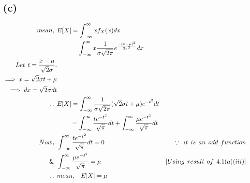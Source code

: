 \documentclass[a4paper,fleqn,11pt]{article}
\theoremstyle{mytheor}
\begin{document}
\subsection{(c)}
\begin{align*}
mean, \hspace{1ex} & E[X] = \int_{-\infty}^{\infty} x f_{X} (x) dx \\
& \hspace{5ex} = \int_{-\infty}^{\infty} x \frac{1}{\sigma \sqrt{2\pi}} e^{\frac{-(x - \mu)^2}{2 \sigma^2}} dx \\
Let \hspace{1ex} t = \frac{x - \mu}{\sqrt{2} \sigma}. \\
\implies x = \sqrt{2} \sigma t + \mu \\
\implies dx = \sqrt{2} \sigma dt \\
\therefore \hspace{1ex} & E[X] = \int_{-\infty}^{\infty} \frac{1}{\sigma \sqrt{2\pi}} (\sqrt{2}\sigma t + \mu) e^{-t^2} dt \\
& \hspace{5ex} = \int_{-\infty}^{\infty} \frac{t e^{-t^2}}{\sqrt{\pi}} dt + \int_{-\infty}^{\infty} \frac{\mu e^{-t^2}}{\sqrt{\pi}} dt \\
Now, \hspace{1ex} & \int_{-\infty}^{\infty} \frac{t e^{-t^2}}{\sqrt{\pi}} dt = 0 &\because \hspace{1ex} it \hspace{1ex} is \hspace{1ex} an \hspace{1ex} odd \hspace{1ex} function \\
\& \hspace{1ex} & \int_{-\infty}^{\infty} \frac{\mu e^{-t^2}}{\sqrt{\pi}} = \mu & [Using \hspace{1ex} result \hspace{1ex} of \hspace{1ex} 4.1(a)(iii)] \\
\therefore \hspace{1ex} & mean, \hspace{1ex} \hspace{1ex} E[X] = \mu
\end{align*}
\end{document}
